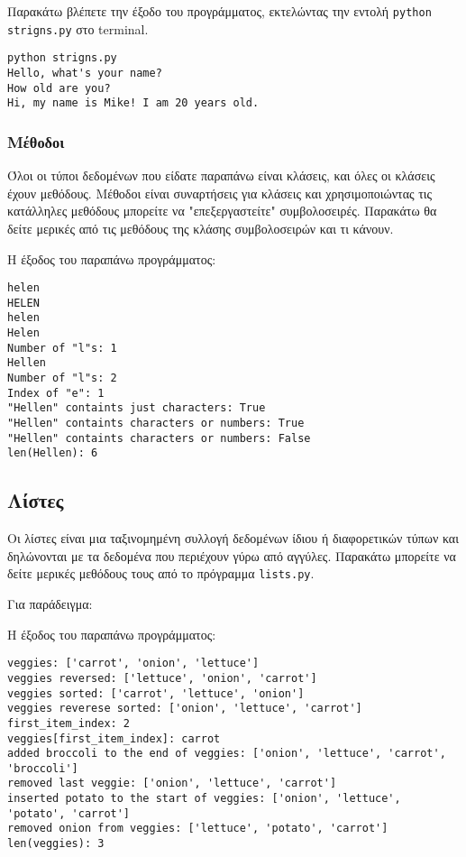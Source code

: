 \documentclass[14pt]{extreport}
\begin{document}
Παρακάτω βλέπετε την έξοδο του προγράμματος, εκτελώντας την εντολή \lstinline{python strigns.py} στο terminal.

\begin{lstlisting}[language={}]
python strigns.py
Hello, what's your name?
How old are you?
Hi, my name is Mike! I am 20 years old.
\end{lstlisting}

\subsubsection{Μέθοδοι}

Όλοι οι τύποι δεδομένων που είδατε παραπάνω είναι κλάσεις, και όλες οι κλάσεις έχουν μεθόδους. Μέθοδοι είναι συναρτήσεις για κλάσεις και χρησιμοποιώντας τις κατάλληλες μεθόδους μπορείτε να "επεξεργαστείτε" συμβολοσειρές. Παρακάτω θα δείτε μερικές από τις μεθόδους της κλάσης συμβολοσειρών και τι κάνουν.




Η έξοδος του παραπάνω προγράμματος:

\begin{lstlisting}[language={}]
helen
HELEN
helen
Helen
Number of "l"s: 1
Hellen
Number of "l"s: 2
Index of "e": 1
"Hellen" containts just characters: True
"Hellen" containts characters or numbers: True
"Hellen" containts characters or numbers: False
len(Hellen): 6
\end{lstlisting}


\subsection{Λίστες}
Οι λίστες είναι μια ταξινομημένη συλλογή δεδομένων ίδιου ή διαφορετικών τύπων και δηλώνονται με τα δεδομένα που περιέχουν γύρω από αγγύλες. Παρακάτω μπορείτε να δείτε μερικές μεθόδους τους από το πρόγραμμα \lstinline{lists.py}.

Για παράδειγμα:



Η έξοδος του παραπάνω προγράμματος:

\begin{lstlisting}[language={}]
veggies: ['carrot', 'onion', 'lettuce']
veggies reversed: ['lettuce', 'onion', 'carrot']
veggies sorted: ['carrot', 'lettuce', 'onion']
veggies reverese sorted: ['onion', 'lettuce', 'carrot']
first_item_index: 2
veggies[first_item_index]: carrot
added broccoli to the end of veggies: ['onion', 'lettuce', 'carrot', 'broccoli']
removed last veggie: ['onion', 'lettuce', 'carrot']
inserted potato to the start of veggies: ['onion', 'lettuce', 'potato', 'carrot']
removed onion from veggies: ['lettuce', 'potato', 'carrot']
len(veggies): 3
\end{lstlisting}
\end{document}
